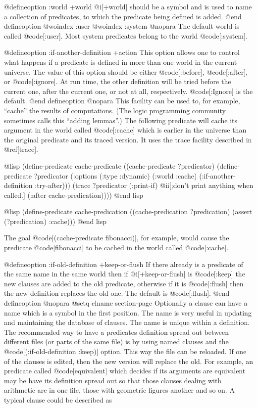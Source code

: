 {@defineoption :world +world
@i[+world] should be a symbol and is used to name a collection of predicates,
to which the predicate being defined is added.
@end defineoption
@woindex :user
@woindex :system
@nopara
The default world is called @code[:user].
Most system predicates belong to the world @code[:system].

@defineoption :if-another-definition +action
This option allows one to control what happens if a predicate is defined in
more than one world in the current universe. The value of this option should be
either @code[:before], @code[:after], or @code[:ignore].
At run time, the other definition
will be tried before the current one, after the current one, or not at all, 
respectively.
@code[:Ignore] is the default.
@end defineoption
@nopara
This facility can be used to, for example, ``cache'' the results of
computations.
(The logic programming community sometimes calls this ``adding lemmas''.)
The following predicate will cache its argument in the world called @code[:cache]
which is earlier in the universe than the original predicate and its
traced version.
It uses the trace facility described in @ref[trace].

@lisp
(define-predicate cache-predicate
 ((cache-predicate ?predicator)
  (define-predicate ?predicator
    (:options (:type :dynamic)
              (:world :cache)
	      (:if-another-definition :try-after)))
  (trace ?predicator
         (:print-if) @ii[;don't print anything when called.]
         (:after cache-predication))))
@end lisp

@lisp
(define-predicate cache-predication
  ((cache-predication ?predication)
   (assert (?predication) :cache)))
@end lisp

The goal @code[(cache-predicate fibonacci)], for example,
would cause the predicate
@code[fibonacci] to be cached in the world called @code[:cache].

@defineoption :if-old-definition +keep-or-flush
If there already is a predicate of the same name in the same world then
if @i[+keep-or-flush] is @code[:keep] the new clauses are added to the old
predicate, otherwise if it is @code[:flush] then the new definition replaces 
the old one. The default is @code[:flush].
@end defineoption
@nopara
@setq clname section-page
Optionally a clause can have a name which is a symbol in the first position.
The name is very useful in updating and maintaining the database of clauses.
The name is unique within a definition.
The recommended way to have a predicates definition spread out between
different files (or parts of the same file) is by using named clauses and the
@code[(:if-old-definition :keep)] option.
This way the file can be reloaded.
If one of the clauses is edited, then the new version will replace the old.
For example, an predicate called @code[equivalent] which decides if its
arguments are equivalent may be have its definition spread out so that those
clauses dealing with arithmetic are in one file, those with geometric figures
another and so on.
A typical clause could be described as

}

